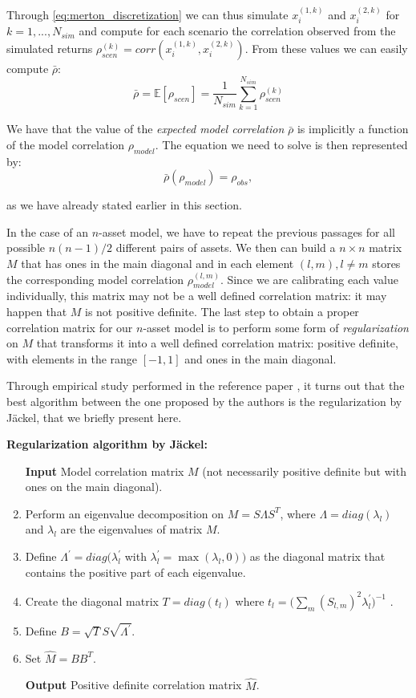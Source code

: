 Through \eqref{eq:merton_discretization} we can thus simulate $ x_i^{(1,k)}$ and 
$ x_i^{(2,k)}$ for $k= 1, ... ,N_{sim}$  and compute for each scenario the correlation observed from the simulated returns $\rho_{scen}^{(k)} = corr(x_i^{(1,k)}, x_i^{(2,k)})$.
From these values we can easily compute $\bar{\rho}$:
\begin{equation}
\label{eq:expected_model_correlation}
	\bar{\rho} = \mathbb{E} [\rho_{scen}] = \frac{1 }{N_{sim}} \sum_{k=1}^{N_{sim}} \rho_{scen}^{(k)}
\end{equation}


We have that  the value of the \textit{expected model correlation} $\bar{\rho}$ is  implicitly a function of the model correlation $\rho_{model}$. The equation we need to solve is then represented by:
\begin{equation}
\label{eq:expected_observed}
\bar{\rho}(\rho_{model}) = \rho_{obs},
\end{equation}

as we have already stated earlier in this section.

\bigskip
In the case of an $n$-asset model, we have to repeat the previous passages for all possible $n(n-1)/2 $ different pairs of assets. We then can build a $n \times n$ matrix $M$ that has ones in the main diagonal and in each element $(l,m), l \neq m$ stores the corresponding model correlation $\rho_{model}^{(l,m)}$.
Since we are calibrating each value individually, this matrix may not be a well defined correlation matrix: it may happen that $M$ is not positive definite.
The last step to obtain a proper correlation matrix for our $n$-asset model is to perform some form of \textit{regularization} on $M$ that transforms it into a well defined correlation matrix: positive definite, with elements in the range $[-1,1]$ and ones in the main diagonal.

Through empirical study performed in the reference paper \citep{PARSIMONIOUS2011}, it turns out that the best algorithm between the one proposed by the authors is the regularization by J\"ackel, that we briefly present here.

\bigskip
\textbf{Regularization algorithm by J\"ackel:}
\begin{enumerate}
	\item[\textbf{Input}] Model correlation matrix $M$ (not necessarily positive definite but with ones on the main diagonal).
	\item Perform an eigenvalue decomposition on $M  = S \Lambda S^T$, where $\Lambda = diag(\lambda_l)$ and $\lambda_l$ are the eigenvalues of matrix $M$.
	\item Define $\Lambda^{'} = diag(\lambda_l^{'}$ with $\lambda_l^{'} = \max(\lambda_l, 0))$ as the diagonal matrix that contains the positive part of each eigenvalue.
	\item Create the diagonal matrix $T = diag(t_l)$ where $t_l =\big(\sum_{m} (S_{l,m})^2 \lambda_l^{'}\big)^{-1}$ .
	\item Define $B = \sqrt{T} S \sqrt{\Lambda^{'}}$.
	\item Set $\widehat{M} = B B^T$.
	\item[\textbf{Output}] Positive definite correlation matrix $\widehat{M}$.
\end{enumerate}

